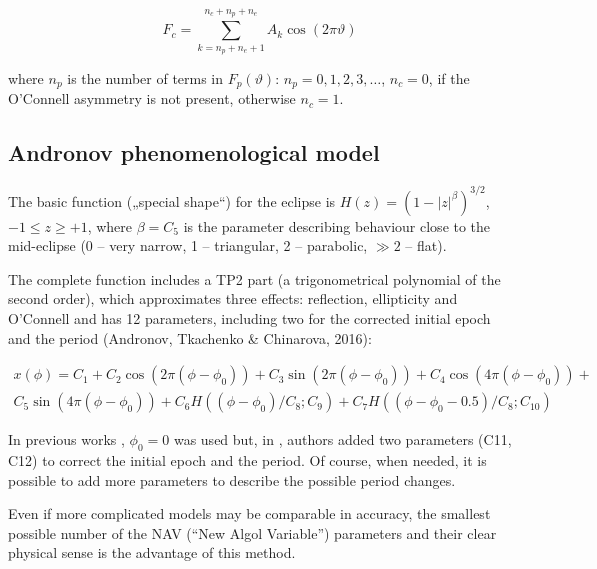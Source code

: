 \begin{equation}\label{eq:mik_Fc}
F_{c}  = \sum_{k=n_{p}+n_{e}+1}^{n_{c}+n_{p}+n_{e}} A_{k}\cos(2\pi\vartheta)
\end{equation}

where $n_{p}$ is the number of terms in $F_{p}(\vartheta)$: $n_{p} = 0, 1, 2, 3,\ldots $,
$n_{c} = 0$, if the O’Connell asymmetry is not present, otherwise $n_{c} = 1$.

\subsection{Andronov phenomenological model}
The basic function („special shape“) for the eclipse is $H(z)=(1-\left| z\right|^\beta)^{3/2}$, $-1\leq z \geq +1$, where $\beta=C_{5}$ 
is the parameter describing behaviour close to the mid-eclipse (0 – very narrow, 1 – triangular, 2 – parabolic, $\gg2$ – flat).

The complete function includes a TP2 part (a trigonometrical polynomial of the second order), which
approximates three effects: reflection, ellipticity and O’Connell and has 12 parameters, including two for the
corrected initial epoch and the period (Andronov, Tkachenko \& Chinarova, 2016):

\begin{equation}\label{eq:andronov}
\begin{split}
x(\phi)=C_{1}+C_{2}\cos(2\pi(\phi-\phi_{0}))+ C_{3}\sin(2\pi(\phi-\phi_{0}))+C_{4}\cos(4\pi(\phi-\phi_{0}))+ \\
C_{5}\sin(4\pi(\phi-\phi_{0}))+ C_{6}H((\phi-\phi_{0})/C_{8};C_{9})+ C_{7}H((\phi-\phi_{0}-0.5)/C_{8};C_{10})
\end{split}
\end{equation}

In previous works \parencite{andronov2012}, $\phi_{0}=0$ was used but, in \cite{andronov2016}, authors added two parameters
(C11, C12) to correct the initial epoch and the period. Of course, when needed, it is possible to add more
parameters to describe the possible period changes.

Even if more complicated models may be comparable in accuracy, the
smallest possible number of the NAV (“New Algol Variable”)  parameters and their clear physical sense is the advantage of this method. 

